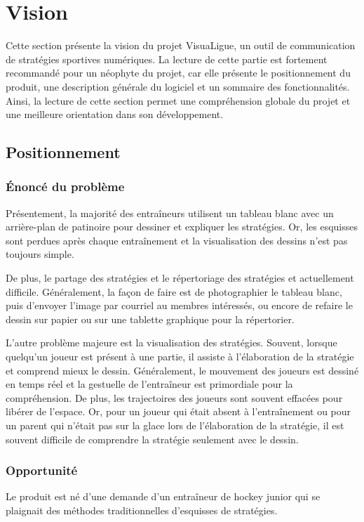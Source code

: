 \chapter{Vision}
\label{s:vision}

Cette section présente la vision du projet VisuaLigue, un outil de communication de stratégies sportives numériques. La lecture de cette partie est fortement recommandé pour un néophyte du projet, car elle présente le positionnement du produit, une description générale du logiciel et un sommaire des fonctionnalités. Ainsi, la lecture de cette section permet une compréhension globale du projet et une meilleure orientation dans son développement.

\section{Positionnement}
\subsection{Énoncé du problème}
Présentement, la majorité des entraîneurs utilisent un tableau blanc avec un arrière-plan de patinoire pour dessiner et expliquer les stratégies. Or, les esquisses sont perdues après chaque entraînement et la visualisation des dessins n'est pas toujours simple.

De plus, le partage des stratégies et le répertoriage des stratégies et actuellement difficile. Généralement, la façon de faire est de photographier le tableau blanc, puis d'envoyer l'image par courriel au membres intéressés, ou encore de refaire le dessin sur papier ou sur une tablette graphique pour la répertorier.

L'autre problème majeure est la visualisation des stratégies. Souvent, lorsque quelqu'un joueur est présent à une partie, il assiste à l'élaboration de la stratégie et comprend mieux le dessin. Généralement, le mouvement des joueurs est dessiné en temps réel et la gestuelle de l'entraîneur est primordiale pour la compréhension. De plus, les trajectoires des joueurs sont souvent effacées pour libérer de l'espace. Or, pour un joueur qui était absent à l'entraînement ou pour un parent qui n'était pas sur la glace lors de l'élaboration de la stratégie, il est souvent difficile de comprendre la stratégie seulement avec le dessin.

\subsection{Opportunité}
Le produit est né d'une demande d'un entraîneur de hockey junior qui se plaignait des méthodes traditionnelles d'esquisses de stratégies.

